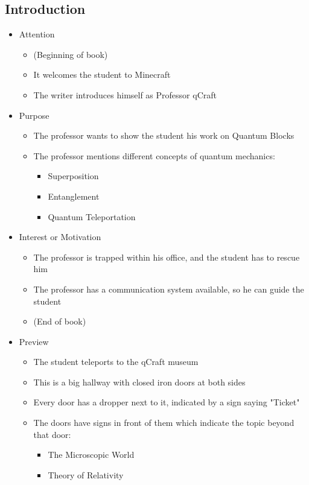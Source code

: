 \documentclass[11pt,twoside]{report} %
\begin{document}
\subsection{Introduction}

\begin{itemize}
	\item Attention
	\begin{itemize}
		\item (Beginning of book)
		\item It welcomes the student to Minecraft
		\item The writer introduces himself as Professor qCraft
	\end{itemize}
	\item Purpose
	\begin{itemize}
		\item The professor wants to show the student his work on Quantum Blocks
		\item The professor mentions different concepts of quantum mechanics:
		\begin{itemize}
			\item Superposition
			\item Entanglement
			\item Quantum Teleportation
		\end{itemize}
	\end{itemize}
	\item Interest or Motivation
	\begin{itemize}
		\item The professor is trapped within his office, and the student has to rescue him
		\item The professor has a communication system available, so he can guide the student
		\item (End of book)
	\end{itemize}
	\item Preview
	\begin{itemize}
		\item The student teleports to the qCraft museum
		\item This is a big hallway with closed iron doors at both sides
		\item Every door has a dropper next to it, indicated by a sign saying "Ticket"
		\item The doors have signs in front of them which indicate the topic beyond that door:
		\begin{itemize}
			\item The Microscopic World
			\item Theory of Relativity

\end{itemize}
\end{itemize}
\end{itemize}
\end{document}
